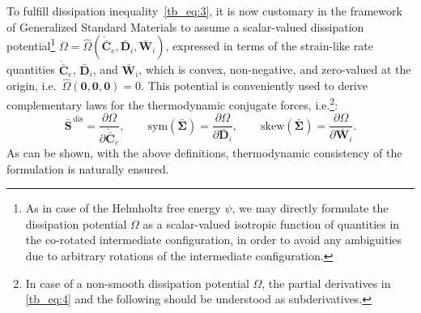 To fulfill dissipation inequality~\eqref{tb_eq:3}, it is now customary in the framework of Generalized Standard Materials to assume a scalar-valued dissipation potential\footnote{As in case of the Helmholtz free energy $\psi$, we may directly formulate the dissipation potential $\Omega$ as a scalar-valued isotropic function of quantities in the co-rotated intermediate configuration, in order to avoid any ambiguities due to arbitrary rotations of the intermediate configuration.} $\Omega = \hat{\Omega}\left(\dot{\bar{\bm{C}}}_e,\bar{\bm{D}}_i,\bar{\bm{W}}_i\right)$, expressed in terms of the strain-like rate quantities $\dot{\bar{\bm{C}}}_e$, $\bar{\bm{D}}_i$, and $\bar{\bm{W}}_i$, which is convex, non-negative, and zero-valued at the origin, i.e.\ $\hat{\Omega}(\bm{0},\bm{0},\bm{0}) = 0$. This potential is conveniently used to derive complementary laws for the thermodynamic conjugate forces, i.e.\footnote{In case of a non-smooth dissipation potential $\Omega$, the partial derivatives in \eqref{tb_eq:4} and the following should be understood as subderivatives.}:
\begin{equation}
\label{tb_eq:4}
\bar{\bm{S}}^{\,\mathrm{dis}} = \frac{\partial \Omega}{\partial \dot{\bar{\bm{C}}}_e}, \qquad \mathrm{sym}(\bar{\bm{\Sigma}}) = \frac{\partial \Omega}{\partial \bar{\bm{D}}_i}, \qquad \mathrm{skew}(\bar{\bm{\Sigma}}) = \frac{\partial \Omega}{\partial \bar{\bm{W}}_i}.
\end{equation}
As can be shown, with the above definitions, thermodynamic consistency of the formulation is naturally ensured.\newline


